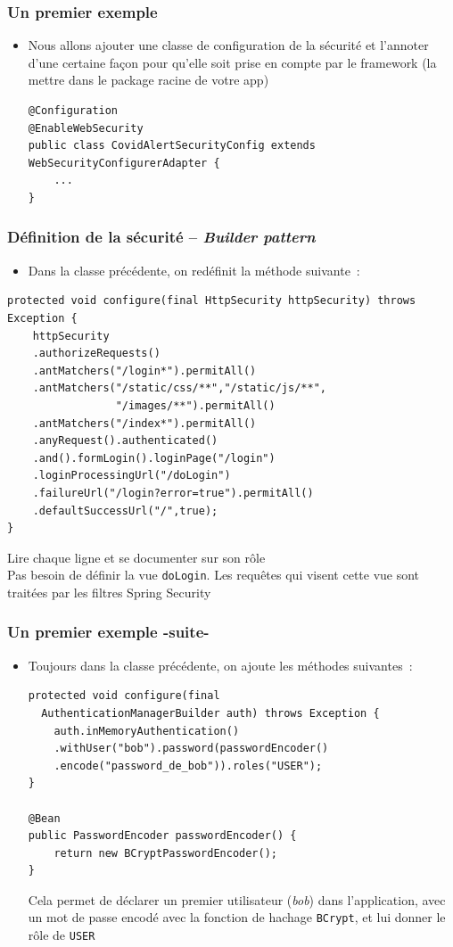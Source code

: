 \documentclass{beamer}
\begin{document}
\begin{frame}[fragile]
	\frametitle{Un premier exemple}
	\begin{itemize}
\item Nous allons ajouter une classe de configuration de la sécurité et l'annoter d'une certaine façon pour qu'elle soit prise en compte par le framework (la mettre dans le package racine de votre app)
\begin{lstlisting}
@Configuration
@EnableWebSecurity
public class CovidAlertSecurityConfig extends WebSecurityConfigurerAdapter {
	...
}
\end{lstlisting}
	\end{itemize}
\end{frame}

\begin{frame}[fragile]
	\frametitle{Définition de la sécurité -- \textit{Builder pattern}}
	\begin{itemize}
		\item Dans la classe précédente, on redéfinit la méthode suivante~:
	\end{itemize}		
\begin{lstlisting}
protected void configure(final HttpSecurity httpSecurity) throws  Exception {
	httpSecurity
	.authorizeRequests()
	.antMatchers("/login*").permitAll()
	.antMatchers("/static/css/**","/static/js/**",
	             "/images/**").permitAll()
	.antMatchers("/index*").permitAll()
	.anyRequest().authenticated()
	.and().formLogin().loginPage("/login")	
	.loginProcessingUrl("/doLogin")
	.failureUrl("/login?error=true").permitAll()
	.defaultSuccessUrl("/",true);
}
\end{lstlisting}
Lire chaque ligne et se documenter sur son rôle\\
Pas besoin de définir la vue \texttt{doLogin}. Les requêtes qui visent cette vue sont traitées par les filtres Spring Security
\end{frame}

\begin{frame}[fragile]
	\frametitle{Un premier exemple -suite-}
	\begin{itemize}
		\item Toujours dans la classe précédente, on ajoute les méthodes suivantes~:
\begin{lstlisting}
protected void configure(final 
  AuthenticationManagerBuilder auth) throws Exception {
	auth.inMemoryAuthentication()
	.withUser("bob").password(passwordEncoder()
	.encode("password_de_bob")).roles("USER");
}

@Bean
public PasswordEncoder passwordEncoder() {
	return new BCryptPasswordEncoder();
}
\end{lstlisting}
Cela permet de déclarer un premier utilisateur (\textit{bob}) dans l'application, avec un mot de passe encodé avec la fonction de hachage \texttt{BCrypt}, et lui donner le rôle de \texttt{USER}
	\end{itemize}
\end{frame}
\end{document}
